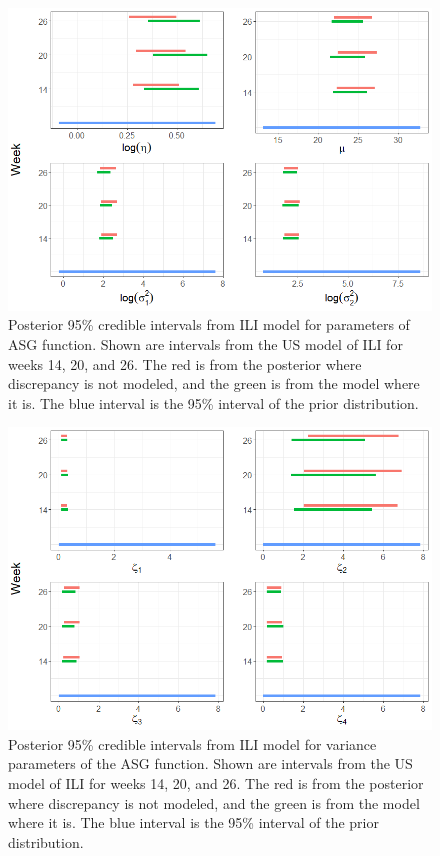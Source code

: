 \documentclass{article}
\begin{document}
\begin{figure}
    \centering
    \includegraphics[scale=.6]{../../Images/posterior_theta.png}
    \caption{Posterior 95\% credible intervals from ILI model for parameters of ASG function. Shown are intervals from the US model of ILI for weeks 14, 20, and 26. The red is from the posterior where discrepancy is not modeled, and the green is from the model where it is. The blue interval is the 95\% interval of the prior distribution.}
    \label{fig:posterior_theta}
\end{figure}


\begin{figure}
    \centering
    \includegraphics[scale=.6]{../../Images/posterior_zeta.png}
    \caption{Posterior 95\% credible intervals from ILI model for variance parameters of the ASG function. Shown are intervals from the US model of ILI for weeks 14, 20, and 26. The red is from the posterior where discrepancy is not modeled, and the green is from the model where it is. The blue interval is the 95\% interval of the prior distribution.}
    \label{fig:posterior_zeta}
\end{figure}
\end{document}

